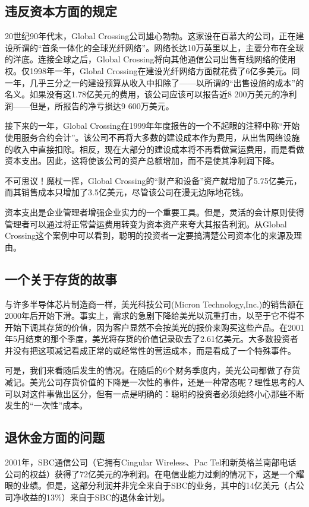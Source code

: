 \documentclass[12pt,oneside]{book}
\begin{document}
\subsection{违反资本方面的规定}
20世纪90年代末，Global Crossing公司雄心勃勃。这家设在百慕大的公司，正在建设所谓的“首条一体化的全球光纤网络”。网络长达10万英里以上，主要分布在全球的洋底。连接全球之后，Global Crossing将向其他通信公司出售有线网络的使用权。仅1998年一年，Global Crossing在建设光纤网络方面就花费了6亿多美元。同一年，几乎三分之一的建设预算从收入中扣除了——以所谓的“出售设施的成本”的名义。如果没有这1.78亿美元的费用，该公司应该可以报告近8 200万美元的净利润——但是，所报告的净亏损达9 600万美元。

接下来的一年，Global Crossing在1999年年度报告的一个不起眼的注释中称“开始使用服务合约会计”。该公司不再将大多数的建设成本作为费用，从出售网络设施的收入中直接扣除。相反，现在大部分的建设成本将不再看做营运费用，而是看做资本支出。因此，这将使该公司的资产总额增加，而不是使其净利润下降。

不可思议！魔杖一挥，Global Crossing的“财产和设备”资产就增加了5.75亿美元，而其销售成本只增加了3.5亿美元，尽管该公司在漫无边际地花钱。

资本支出是企业管理者增强企业实力的一个重要工具。但是，灵活的会计原则使得管理者可以通过将正常营运费用转变为资本资产来夸大其报告利润。从Global Crossing这个案例中可以看到，聪明的投资者一定要搞清楚公司资本化的来源及理由。

\subsection{一个关于存货的故事}
与许多半导体芯片制造商一样，美光科技公司(Micron Technology,Inc.)的销售额在2000年后开始下滑。事实上，需求的急剧下降给美光以沉重打击，以至于它不得不开始下调其存货的价值，因为客户显然不会按美光的报价来购买这些产品。在2001年5月结束的那个季度，美光将存货的价值记录砍去了2.61亿美元。大多数投资者并没有把这项减记看成正常的或经常性的营运成本，而是看成了一个特殊事件。

可是，我们来看随后发生的情况。在随后的6个财务季度内，美光公司都做了存货减记。美光公司存货价值的下降是一次性的事件，还是一种常态呢？理性思考的人可以对这件事做出区分，但有一点是明确的：聪明的投资者必须始终小心那些不断发生的“一次性”成本。

\subsection{退休金方面的问题}
2001年，SBC通信公司（它拥有Cingular Wireless、Pac Tel和新英格兰南部电话公司的权益）获得了72亿美元的净利润。在电信业能力过剩的情况下，这是一个耀眼的业绩。但是，这部分利润并非完全来自于SBC的业务，其中的14亿美元（占公司净收益的13\%）来自于SBC的退休金计划。
\end{document}
